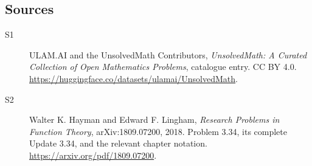\documentclass[11pt]{book}
\begin{document}
\subsection{Sources}
\begin{description}
\item[\hypertarget{source:statement:1}{S1}] ULAM.AI and the UnsolvedMath Contributors, \emph{UnsolvedMath: A Curated Collection of Open Mathematics Problems}, catalogue entry. CC BY 4.0. \url{https://huggingface.co/datasets/ulamai/UnsolvedMath}.
\item[\hypertarget{source:statement:2}{S2}] Walter K. Hayman and Edward F. Lingham, \emph{Research Problems in Function Theory}, arXiv:1809.07200, 2018. Problem 3.34, its complete Update 3.34, and the relevant chapter notation. \url{https://arxiv.org/pdf/1809.07200}.
\end{description}
\label{end:statement}
\end{document}
